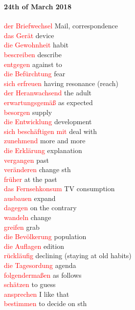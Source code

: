 \documentclass{article}
\begin{document}
	\textbf{24th of March 2018}\\\\
	\textcolor{red}{der Briefwechsel} Mail, correspondence\\
	\textcolor{red}{das Gerät} device \\
	\textcolor{red}{die Gewohnheit} habit \\
	\textcolor{red}{bescreiben} describe\\
	\textcolor{red}{entgegen} against to \\
	\textcolor{red}{die Befürchtung} fear\\
	\textcolor{red}{sich erfreuen} having resonance (reach) \\
	\textcolor{red}{der Heranwachsend} the adult \\
	\textcolor{red}{erwartungsgemäß} as expected \\
	\textcolor{red}{besorgen} supply \\
	\textcolor{red}{die Entwicklung} development \\
	\textcolor{red}{sich beschäftigen mit} deal with \\
	\textcolor{red}{zunehmend} more and more \\
	\textcolor{red}{die Erklärung} explanation \\
	\textcolor{red}{vergangen} past\\
	\textcolor{red}{veränderen} change sth \\
	\textcolor{red}{früher} at the past \\
	\textcolor{red}{das Fernsehkonsum} TV consumption\\
	\textcolor{red}{ausbauen} expand \\
	\textcolor{red}{dagegen} on the contrary\\
	\textcolor{red}{wandeln} change\\
	\textcolor{red}{greifen} grab\\
	\textcolor{red}{die Bevölkerung} population \\
	\textcolor{red}{die Auflagen} edition\\
	\textcolor{red}{rückläufig} declining (staying at old habits)\\
	\textcolor{red}{die Tagesordung} agenda \\
	\textcolor{red}{folgendermaßen} as follows \\ 
	\textcolor{red}{schätzen} to guess\\
	\textcolor{red}{ansprechen} I like that \\
	\textcolor{red}{bestimmen} to decide on sth\\ 
\end{document}
